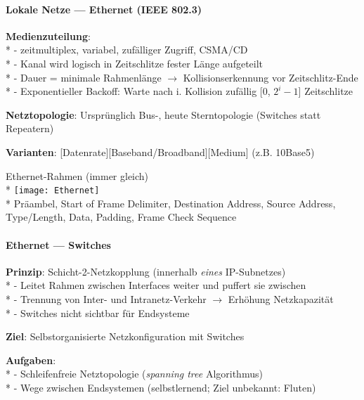 \paragraph{Lokale Netze --- Ethernet (IEEE 802.3)}
\begin{items}
  \item \textbf{Medienzuteilung}: \\*
    - zeitmultiplex, variabel, zufälliger Zugriff, CSMA/CD\\*
    - Kanal wird logisch in Zeitschlitze fester Länge aufgeteilt \\*
    - Dauer = minimale Rahmenlänge \( \to \) Kollisionserkennung vor Zeitschlitz-Ende\\*
    - Exponentieller Backoff: Warte nach i. Kollision zufällig [0, \( 2^i-1 \)] Zeitschlitze
  \item \textbf{Netztopologie}: Ursprünglich Bus-, heute Sterntopologie (Switches statt Repeatern)
  \item \textbf{Varianten}: [Datenrate][Baseband/Broadband][Medium] (z.B. 10Base5)
   \item Ethernet-Rahmen (immer gleich)\\*
   \texttt{[image: Ethernet]}\\*
   Präambel, Start of Frame Delimiter, Destination Address, Source Address, Type/Length, Data, Padding, Frame Check Sequence
\end{items}

\paragraph{Ethernet --- Switches}
\begin{items}
  \item \textbf{Prinzip}: Schicht-2-Netzkopplung (innerhalb \emph{eines} IP-Subnetzes) \\*
    - Leitet Rahmen zwischen Interfaces weiter und puffert sie zwischen\\*
    - Trennung von Inter- und Intranetz-Verkehr \( \to \) Erhöhung Netzkapazität \\*
    - Switches nicht sichtbar für Endsysteme
  \item \textbf{Ziel}: Selbstorganisierte Netzkonfiguration mit Switches
  \item \textbf{Aufgaben}: \\*
    - Schleifenfreie Netztopologie (\emph{spanning tree} Algorithmus) \\*
    - Wege zwischen Endsystemen (selbstlernend; Ziel unbekannt: Fluten)
\end{items}

